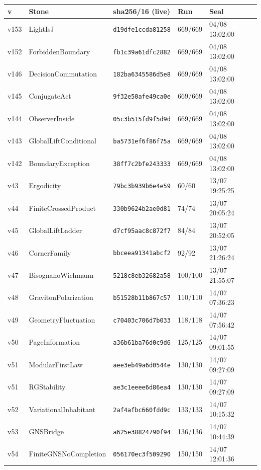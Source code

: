 \documentclass[11pt]{article}
\theoremstyle{definition}\newtheorem{deriv}{Derivation}
\begin{document}
{\small\begin{longtable}{@{}lllll@{}}\toprule v & Stone & sha256/16 (live) & Run & Seal \\ \midrule\endhead 
v153 & LightIsJ & \texttt{d19dfe1ccda81258} & 669/669 & 04/08 13:02:00 \\
v152 & ForbiddenBoundary & \texttt{fb1c39a61dfc2882} & 669/669 & 04/08 13:02:00 \\
v146 & DecisionCommutation & \texttt{182ba6345586d5e8} & 669/669 & 04/08 13:02:00 \\
v145 & ConjugateAct & \texttt{9f32e50afe49ca0e} & 669/669 & 04/08 13:02:00 \\
v144 & ObserverInside & \texttt{05c3b515fd9f5d9d} & 669/669 & 04/08 13:02:00 \\
v143 & GlobalLiftConditional & \texttt{ba5731ef6f86f75a} & 669/669 & 04/08 13:02:00 \\
v142 & BoundaryException & \texttt{38ff7c2bfe243333} & 669/669 & 04/08 13:02:00 \\
v43 & Ergodicity & \texttt{79bc3b939b6e4e59} & 60/60 & 13/07 19:25:25 \\
v44 & FiniteCrossedProduct & \texttt{330b9624b2ae0d81} & 74/74 & 13/07 20:05:24 \\
v45 & GlobalLiftLadder & \texttt{d7cf95aac8c872f7} & 84/84 & 13/07 20:52:05 \\
v46 & CornerFamily & \texttt{bbceea91341abcf2} & 92/92 & 13/07 21:26:24 \\
v47 & BisognanoWichmann & \texttt{5218c8eb32682a58} & 100/100 & 13/07 21:55:07 \\
v48 & GravitonPolarization & \texttt{b51528b11b867c57} & 110/110 & 14/07 07:36:23 \\
v49 & GeometryFluctuation & \texttt{c70403c706d7b033} & 118/118 & 14/07 07:56:42 \\
v50 & PageInformation & \texttt{a36b61ba76d0c9d6} & 125/125 & 14/07 09:01:55 \\
v51 & ModularFirstLaw & \texttt{aee3eb49a6d0544e} & 130/130 & 14/07 09:27:09 \\
v51 & RGStability & \texttt{ae3c1eeee6d86ea4} & 130/130 & 14/07 09:27:09 \\
v52 & VariationalInhabitant & \texttt{2af4afbc660fdd9c} & 133/133 & 14/07 10:15:32 \\
v53 & GNSBridge & \texttt{a625e38824790f94} & 136/136 & 14/07 10:44:39 \\
v54 & FiniteGNSNoCompletion & \texttt{056170ec3f509290} & 150/150 & 14/07 12:01:36 \\

\end{longtable}}
\end{document}

